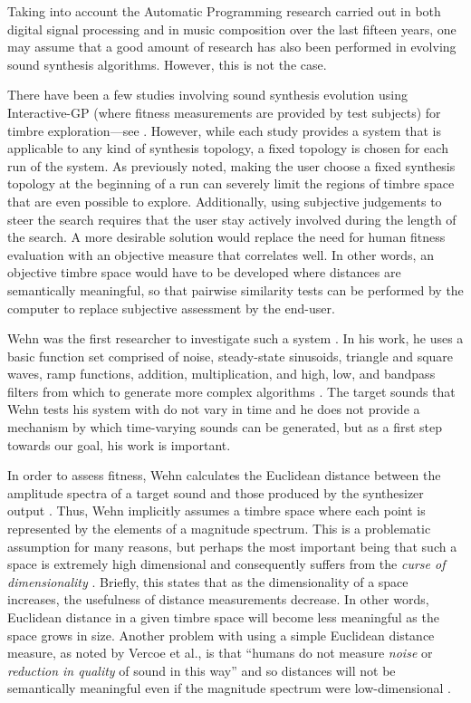 \documentclass[a4paper,12pt]{report} 	%
\numberwithin{figure}{chapter}
\numberwithin{table}{chapter}
\numberwithin{equation}{chapter}
\begin{document}
\begin{flushleft}
Taking into account the Automatic Programming research carried out in both digital signal processing and in music composition over the last fifteen years, one may assume that a good amount of research has also been performed in evolving sound synthesis algorithms. However, this is not the case.

There have been a few studies involving sound synthesis evolution using Interactive-GP (where fitness measurements are provided by test subjects) for timbre exploration---see \cite{Dahlstedt:2001dd, Mandelis:2005iw, McDermott:2006gd}. However, while each study provides a system that is applicable to any kind of synthesis topology, a fixed topology is chosen for each run of the system. As previously noted, making the user choose a fixed synthesis topology at the beginning of a run can severely limit the regions of timbre space that are even possible to explore. Additionally, using subjective judgements to steer the search requires that the user stay actively involved during the length of the search. A more desirable solution would replace the need for human fitness evaluation with an objective measure that correlates well. In other words, an objective timbre space would have to be developed where distances are semantically meaningful, so that pairwise similarity tests can be performed by the computer to replace subjective assessment by the end-user.

Wehn was the first researcher to investigate such a system \cite{Wehn:1998bh}. In his work, he uses a basic function set comprised of noise, steady-state sinusoids, triangle and square waves, ramp functions, addition, multiplication, and high, low, and bandpass filters from which to generate more complex algorithms \cite[p. 2]{Wehn:1998bh}. The target sounds that Wehn tests his system with do not vary in time and he does not provide a mechanism by which time-varying sounds can be generated, but as a first step towards our goal, his work is important.

In order to assess fitness, Wehn calculates the Euclidean distance between the amplitude spectra of a target sound and those produced by the synthesizer output \cite[p. 2]{Wehn:1998bh}. Thus, Wehn implicitly assumes a timbre space where each point is represented by the elements of a magnitude spectrum. This is a problematic assumption for many reasons, but perhaps the most important being that such a space is extremely high dimensional and consequently suffers from the \emph{curse of dimensionality} \cite{Powell:NoRead}. Briefly, this states that as the dimensionality of a space increases, the usefulness of distance measurements decrease. In other words, Euclidean distance in a given timbre space will become less meaningful as the space grows in size. Another problem with using a simple Euclidean distance measure, as noted by Vercoe et al., is that ``humans do not measure \emph{noise} or \emph{reduction in quality} of sound in this way'' and so distances will not be semantically meaningful even if the magnitude spectrum were low-dimensional \cite[p. 2]{Vercoe:1998hh}.


\end{flushleft}
\end{document}
